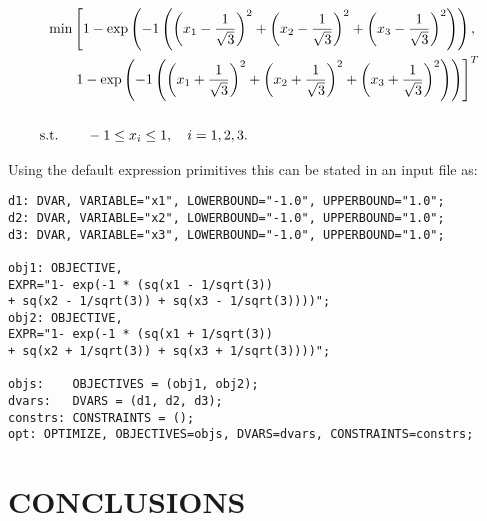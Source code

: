 \documentclass[%
reprint,
amsmath,amssymb,
aps,
prstab,
]{revtex4-1}
\begin{document}
	\begin{widetext}
		\begin{align} \label{eqn:bench}
		\text{min} & \left[ 1 - \exp \left( -1 \left(
		\left(x_1 - \frac{1}{\sqrt{3}} \right)^2 +
		\left(x_2 - \frac{1}{\sqrt{3}} \right)^2 +
		\left(x_3 - \frac{1}{\sqrt{3}} \right)^2 \right)\right), \right. \\
		\vspace{3em} 
		& \left. 1 - \exp \left( -1 \left(
		\left(x_1 + \frac{1}{\sqrt{3}} \right)^2 +
		\left(x_2 + \frac{1}{\sqrt{3}} \right)^2 +
		\left(x_3 + \frac{1}{\sqrt{3}} \right)^2 \right)\right) \right]^T \nonumber \\
		\vspace{3em} \\
		\text{s.t.} \quad & \quad -1 \le x_i \le 1, \quad i=1,2,3 \nonumber
		\text{.}
		\end{align}
	\end{widetext}



%
Using the default expression primitives this can be stated in an input file
  as:
%

\begin{flushleft}
\begin{Verbatim}[fontsize=\scriptsize]
d1: DVAR, VARIABLE="x1", LOWERBOUND="-1.0", UPPERBOUND="1.0";
d2: DVAR, VARIABLE="x2", LOWERBOUND="-1.0", UPPERBOUND="1.0";
d3: DVAR, VARIABLE="x3", LOWERBOUND="-1.0", UPPERBOUND="1.0";

obj1: OBJECTIVE,
EXPR="1- exp(-1 * (sq(x1 - 1/sqrt(3)) 
+ sq(x2 - 1/sqrt(3)) + sq(x3 - 1/sqrt(3))))";
obj2: OBJECTIVE,
EXPR="1- exp(-1 * (sq(x1 + 1/sqrt(3)) 
+ sq(x2 + 1/sqrt(3)) + sq(x3 + 1/sqrt(3))))";

objs:    OBJECTIVES = (obj1, obj2);
dvars:   DVARS = (d1, d2, d3);
constrs: CONSTRAINTS = ();
opt: OPTIMIZE, OBJECTIVES=objs, DVARS=dvars, CONSTRAINTS=constrs;
\end{Verbatim}
\end{flushleft}



 



\section{CONCLUSIONS} \label{sec:conclusions}
\end{document}
